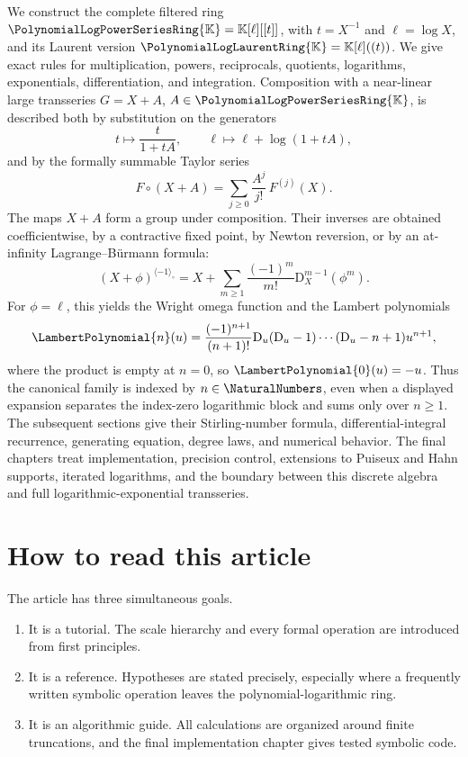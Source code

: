 \documentclass[11pt,oneside,openany]{book}
\newcommand{\K}{\mathbb{K}}
\newcommand{\Rring}{\PolynomialLogPowerSeriesRing{\K}}
\newcommand{\Pring}{\PolynomialLogLaurentRing{\K}}
\newcommand{\compose}{\mathbin{\circ}}
\newcommand{\rev}{^{\langle-1\rangle_{\circ}}}
\newcommand{\D}{\mathrm{D}}
\begin{document}
We construct the complete filtered ring
\(\Rring=\K[\ell][[t]]\), with \(t=X^{-1}\) and
\(\ell=\log X\), and its Laurent version
\(\Pring=\K[\ell]((t))\).  We give exact rules for multiplication, powers,
reciprocals, quotients, logarithms, exponentials, differentiation, and
integration.  Composition with a near-linear large transseries
\(G=X+A\), \(A\in\Rring\), is described both by substitution on the generators
\[
  t\mapsto \frac{t}{1+tA},
  \qquad
  \ell\mapsto \ell+\log(1+tA),
\]
and by the formally summable Taylor series
\[
  F\compose(X+A)=\sum_{j\geq0}\frac{A^j}{j!}\,F^{(j)}(X).
\]
The maps \(X+A\) form a group under composition.  Their inverses are obtained
coefficientwise, by a contractive fixed point, by Newton reversion, or by an
at-infinity Lagrange--Bürmann formula:
\[
  (X+\phi)\rev
  =X+\sum_{m\geq1}\frac{(-1)^m}{m!}
       \D_X^{m-1}\!\left(\phi^m\right).
\]
For \(\phi=\ell\), this yields the Wright omega function and the Lambert
polynomials
\[
 \LambertPolynomial{n}(u)=\frac{(-1)^{n+1}}{(n+1)!}
   \D_u(\D_u-1)\cdots(\D_u-n+1)u^{n+1},
\]
where the product is empty at \(n=0\), so
\(\LambertPolynomial{0}(u)=-u\).  Thus the canonical family is indexed by
\(n\in\NaturalNumbers\), even when a displayed expansion separates the
index-zero logarithmic block and sums only over \(n\ge1\).
The subsequent sections give their Stirling-number formula,
differential-integral recurrence,
generating equation, degree laws, and numerical behavior.  The final chapters
treat implementation, precision control, extensions to Puiseux and Hahn
supports, iterated logarithms, and the boundary between this discrete algebra
and full logarithmic-exponential transseries.

\chapter*{How to read this article}
The article has three simultaneous goals.

\begin{enumerate}
\item It is a tutorial.  The scale hierarchy and every formal operation are
introduced from first principles.
\item It is a reference.  Hypotheses are stated precisely, especially where a
frequently written symbolic operation leaves the polynomial-logarithmic ring.
\item It is an algorithmic guide.  All calculations are organized around finite
truncations, and the final implementation chapter gives tested symbolic code.
\end{enumerate}
\end{document}
